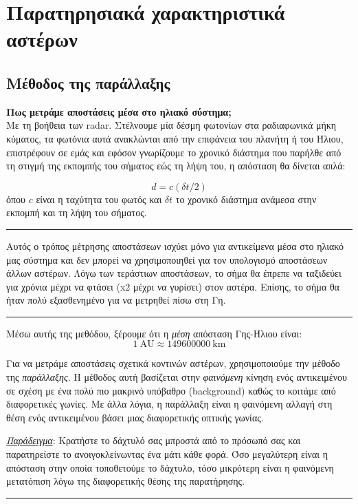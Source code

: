 \chapter{Παρατηρησιακά χαρακτηριστικά αστέρων}
\label{ch:Chapter2}

\section{Μέθοδος της παράλλαξης}

\textbf{Πως μετράμε αποστάσεις μέσα στο ηλιακό σύστημα;}\\
Με τη βοήθεια των radar. Στέλνουμε μία δέσμη φωτονίων στα ραδιαφωνικά μήκη κύματος, τα φωτόνια αυτά ανακλώνται από την επιφάνεια του πλανήτη ή του Ήλιου, επιστρέφουν σε εμάς και εφόσον γνωρίζουμε το χρονικό διάστημα που παρήλθε από τη στιγμή της εκπομπής του σήματος εώς τη λήψη του, η απόσταση θα δίνεται απλά:

\begin{equation}
    d = c (\delta t / 2)
\end{equation}
όπου $c$ είναι η ταχύτητα του φωτός και $\delta t$ το χρονικό διάστημα ανάμεσα στην εκπομπή και τη λήψη του σήματος.
\\
{\color{red} \hrule}
Αυτός ο τρόπος μέτρησης αποστάσεων ισχύει μόνο για αντικείμενα μέσα στο ηλιακό μας σύστημα και δεν μπορεί να χρησιμοποιηθεί για τον υπολογισμό αποστάσεων άλλων αστέρων. Λόγω των τεράστιων αποστάσεων, το σήμα θα έπρεπε να ταξιδεύει για χρόνια μέχρι να φτάσει (x2 μέχρι να γυρίσει) στον αστέρα.
Επίσης, το σήμα θα ήταν πολύ εξασθενημένο για να μετρηθεί πίσω στη Γη.
{\color{red} \hrule }


Μέσω αυτής της μεθόδου, ξέρουμε ότι η \textit{μέση} απόσταση Γης-Ήλιου είναι: $$1 \ \text{AU} \approx 149600000 \ \text{km}$$

Για να μετράμε αποστάσεις σχετικά κοντινών αστέρων, χρησιμοποιούμε την μέθοδο της \textit{παράλλαξης}. Η μέθοδος αυτή βασίζεται στην \textit{φαινόμενη} κίνηση ενός αντικειμένου σε σχέση με ένα πολύ πιο μακρινό υπόβαθρο (background) καθώς το κοιτάμε από διαφορετικές γωνίες. Με άλλα λόγια, η παράλλαξη είναι η φαινόμενη αλλαγή στη θέση ενός αντικειμένου βάσει μιας διαφορετικής οπτικής γωνίας.

\textit{\underline{Παράδειγμα}}: Κρατήστε το δάχτυλό σας μπροστά από το πρόσωπό σας και παρατηρείστε το ανοιγοκλείνωντας ένα μάτι κάθε φορά. Όσο μεγαλύτερη είναι η απόσταση στην οποία τοποθετούμε το δάχτυλο, τόσο μικρότερη είναι η φαινόμενη μετατόπιση λόγω της διαφορετικής θέσης της παρατήρησης.
\hrule

